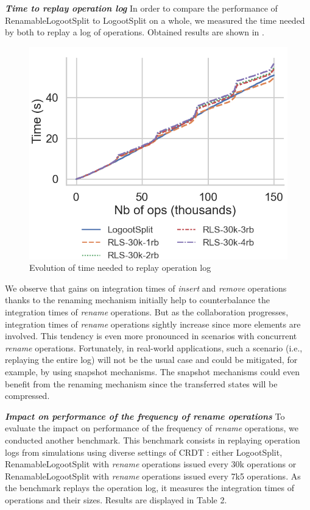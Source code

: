 \documentclass[10pt,journal,compsoc]{IEEEtran}
\let\MYoriglatexcaption\caption
\renewcommand{\caption}[2][\relax]{\MYoriglatexcaption[#2]{#2}}
\newcommand{\headerparagraph}[1]{\textbf{\emph{#1}}\quad}
\begin{document}
\headerparagraph{Time to replay operation log}
%
In order to compare the performance of RenamableLogootSplit to LogootSplit on a whole, we measured the time needed by both to replay a log of operations.
Obtained results are shown in .

\begin{figure}[!ht]
    \centering
    \includegraphics[width=0.7\columnwidth]{img/replay-log-30k-with-legend.png}
    \caption{Evolution of time needed to replay operation log}
    \label{fig:time-to-replay-log}
\end{figure}

We observe that gains on integration times of \emph{insert} and \emph{remove} operations thanks to the renaming mechanism initially help to counterbalance the integration times of \emph{rename} operations.
But as the collaboration progresses, integration times of \emph{rename} operations sightly increase since more elements are involved.
This tendency is even more pronounced in scenarios with concurrent \emph{rename} operations.
Fortunately, in real-world applications, such a scenario (i.e., replaying the entire log) will not be the usual case and could be mitigated, for example, by using snapshot mechanisms.
The snapshot mechanisms could even benefit from the renaming mechanism since the transferred states will be compressed.

\headerparagraph{Impact on performance of the frequency of \emph{rename} operations}
%
To evaluate the impact on performance of the frequency of \emph{rename} operations, we conducted another benchmark.
This benchmark consists in replaying operation logs from simulations using diverse settings of \ac{CRDT} : either LogootSplit, RenamableLogootSplit with \emph{rename} operations issued every 30k operations or RenamableLogootSplit with \emph{rename} operations issued every 7k5 operations.
As the benchmark replays the operation log, it measures the integration times of operations and their sizes.
Results are displayed in Table 2.
\end{document}
